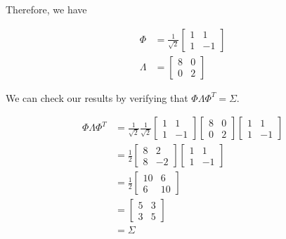 \documentclass[a4paper, 10pt, twoside]{article}
\begin{document}
\begin{enumerate}[a)]
          Therefore, we have

          \begin{align*}
              \Phi    & = \frac{1}{\sqrt{2}}\begin{bmatrix}1&1\\1&-1\end{bmatrix} \\
              \Lambda & = \begin{bmatrix}8&0\\0&2\end{bmatrix}
          \end{align*}

          We can check our results by verifying that $\Phi \Lambda \Phi^T = \Sigma$.

          \begin{align*}
              \Phi \Lambda \Phi^T & = \frac{1}{\sqrt{2}}\frac{1}{\sqrt{2}}\begin{bmatrix}1&1\\1&-1\end{bmatrix}\begin{bmatrix}8&0\\0&2\end{bmatrix}\begin{bmatrix}1&1\\1&-1\end{bmatrix} \\
                                  & = \frac{1}{2}\begin{bmatrix}8&2\\8&-2\end{bmatrix}\begin{bmatrix}1&1\\1&-1\end{bmatrix}                                                    \\
                                  & = \frac{1}{2}\begin{bmatrix}10&6\\6&10\end{bmatrix}                                                                              \\
                                  & = \begin{bmatrix}5&3\\3&5\end{bmatrix}                                                                                         \\
                                  & = \Sigma

\end{align*}
\end{enumerate}
\end{document}
